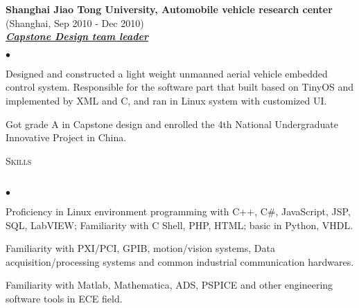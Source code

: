 \documentclass{article}
\newcommand{\lineunder}{\vspace*{-8pt} \\ \hspace*{-18pt} \hrulefill \\}
\newcommand{\header}[1]{{\hspace*{-15pt}\vspace*{6pt} \textsc{#1}} \vspace*{-6pt} \lineunder}
\newcommand{\employer}[3]{{ \textbf{#1} (#2)\\ \underline{\textbf{\emph{#3}}}\\  }}
\newenvironment{achievements}{\begin{list}{$\bullet$}{\topsep 0pt \itemsep -2pt}}{\vspace*{4pt}\end{list}}
\begin{document}
\employer{Shanghai Jiao Tong University, Automobile vehicle research center}{Shanghai, Sep 2010 - Dec 2010}{Capstone Design team leader}
	\begin{achievements}
	\item Designed and constructed a light weight unmanned aerial vehicle embedded control system. Responsible for the software part that built based on TinyOS and implemented by XML and C, and ran in Linux system with customized UI. 
	\item Got grade A in Capstone design and enrolled the 4th National Undergraduate Innovative Project in China. 
	\end{achievements}


\header{Skills}
\begin{achievements}
\item Proficiency in Linux environment programming with C++, C\#, JavaScript, JSP, SQL, LabVIEW; Familiarity with C Shell, PHP, HTML; basic in Python, VHDL.
\item Familiarity with PXI/PCI, GPIB, motion/vision systems, Data acquisition/processing systems and common industrial communication hardwares.
\item Familiarity with Matlab, Mathematica, ADS, PSPICE and other engineering software tools in ECE field.

\end{achievements}
\end{document}
